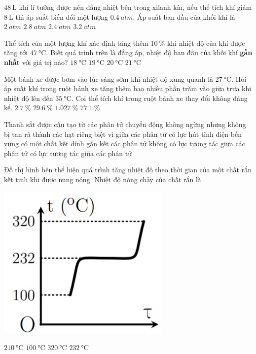 \begin{ex}
	$\SI{48}{\liter}$ khí lí tưởng được nén đẳng nhiệt bên trong xilanh kín, nếu thể tích khí giảm $\SI{8}{\liter}$ thì áp suất biến đổi một lượng $\SI{0.4}{atm}$. Áp suất ban đầu của khối khí là
	\choice
	{\True $\SI{2}{atm}$}
	{$\SI{2.8}{atm}$}
	{$\SI{2.4}{atm}$}
	{$\SI{3.2}{atm}$}
\end{ex}
\begin{ex}
	Thể tích của một lượng khí xác định tăng thêm $\SI{10}{\percent}$ khi nhiệt độ của khí được tăng tới $\SI{47}{\celsius}$. Biết quá trình trên là đẳng áp, nhiệt độ ban đầu của khối khí \textbf{gần nhất} với giá trị nào?
	\choice
	{\True $\SI{18}{\celsius}$}
	{$\SI{19}{\celsius}$}
	{$\SI{20}{\celsius}$}
	{$\SI{21}{\celsius}$}
\end{ex}
\begin{ex}
	Một bánh xe được bơm vào lúc sáng sớm khi nhiệt độ xung quanh là $\SI{27}{\celsius}$. Hỏi áp suất khí trong ruột bánh xe tăng thêm bao nhiêu phần trăm vào giữa trưa khi nhiệt độ lên đến $\SI{35}{\celsius}$. Coi thể tích khí trong ruột bánh xe thay đổi không đáng kể.
	\choice
	{\True $\SI{2.7}{\percent}$}
	{$\SI{29.6}{\percent}$}
	{$\SI{1.027}{\percent}$}
	{$\SI{77.1}{\percent}$}
\end{ex}
\begin{ex}
Thanh sắt được cấu tạo từ các phân tử chuyển động không ngừng nhưng không bị tan rã thành các hạt riêng biệt vì
	\choice
	{giữa các phân tử có lực hút tĩnh điện bền vững}
	{có một chất kết dính gắn kết các phân tử}
	{không có lực tương tác giữa các phân tử}
	{\True có lực tương tác giữa các phân tử}
	\loigiai{}
\end{ex}
\begin{ex}
	Đồ thị hình bên thể hiện quá trình tăng nhiệt độ theo thời gian của một chất rắn kết tinh khi được nung nóng. Nhiệt độ nóng chảy của chất rắn là
	\begin{center}
		\includegraphics[width=0.2\linewidth]{../figs/D12-5-1}	
	\end{center}
	\choice
	{$\SI{210}{\celsius}$}
	{$\SI{100}{\celsius}$}
	{$\SI{320}{\celsius}$}
	{\True $\SI{232}{\celsius}$}
	\loigiai{}
\end{ex}
